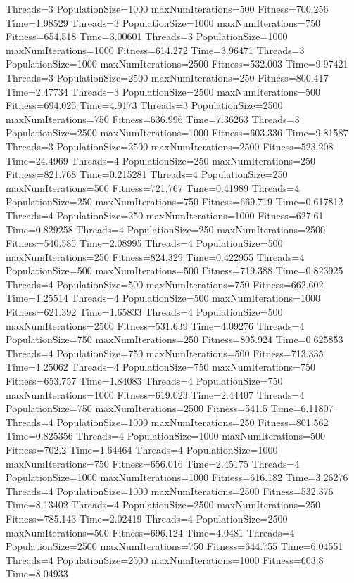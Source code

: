 \documentclass[10pt,letterpaper]{article}
\begin{document}
Threads=3 PopulationSize=1000 maxNumIterations=500 Fitness=700.256 Time=1.98529
Threads=3 PopulationSize=1000 maxNumIterations=750 Fitness=654.518 Time=3.00601
Threads=3 PopulationSize=1000 maxNumIterations=1000 Fitness=614.272 Time=3.96471
Threads=3 PopulationSize=1000 maxNumIterations=2500 Fitness=532.003 Time=9.97421
Threads=3 PopulationSize=2500 maxNumIterations=250 Fitness=800.417 Time=2.47734
Threads=3 PopulationSize=2500 maxNumIterations=500 Fitness=694.025 Time=4.9173
Threads=3 PopulationSize=2500 maxNumIterations=750 Fitness=636.996 Time=7.36263
Threads=3 PopulationSize=2500 maxNumIterations=1000 Fitness=603.336 Time=9.81587
Threads=3 PopulationSize=2500 maxNumIterations=2500 Fitness=523.208 Time=24.4969
Threads=4 PopulationSize=250 maxNumIterations=250 Fitness=821.768 Time=0.215281
Threads=4 PopulationSize=250 maxNumIterations=500 Fitness=721.767 Time=0.41989
Threads=4 PopulationSize=250 maxNumIterations=750 Fitness=669.719 Time=0.617812
Threads=4 PopulationSize=250 maxNumIterations=1000 Fitness=627.61 Time=0.829258
Threads=4 PopulationSize=250 maxNumIterations=2500 Fitness=540.585 Time=2.08995
Threads=4 PopulationSize=500 maxNumIterations=250 Fitness=824.329 Time=0.422955
Threads=4 PopulationSize=500 maxNumIterations=500 Fitness=719.388 Time=0.823925
Threads=4 PopulationSize=500 maxNumIterations=750 Fitness=662.602 Time=1.25514
Threads=4 PopulationSize=500 maxNumIterations=1000 Fitness=621.392 Time=1.65833
Threads=4 PopulationSize=500 maxNumIterations=2500 Fitness=531.639 Time=4.09276
Threads=4 PopulationSize=750 maxNumIterations=250 Fitness=805.924 Time=0.625853
Threads=4 PopulationSize=750 maxNumIterations=500 Fitness=713.335 Time=1.25062
Threads=4 PopulationSize=750 maxNumIterations=750 Fitness=653.757 Time=1.84083
Threads=4 PopulationSize=750 maxNumIterations=1000 Fitness=619.023 Time=2.44407
Threads=4 PopulationSize=750 maxNumIterations=2500 Fitness=541.5 Time=6.11807
Threads=4 PopulationSize=1000 maxNumIterations=250 Fitness=801.562 Time=0.825356
Threads=4 PopulationSize=1000 maxNumIterations=500 Fitness=702.2 Time=1.64464
Threads=4 PopulationSize=1000 maxNumIterations=750 Fitness=656.016 Time=2.45175
Threads=4 PopulationSize=1000 maxNumIterations=1000 Fitness=616.182 Time=3.26276
Threads=4 PopulationSize=1000 maxNumIterations=2500 Fitness=532.376 Time=8.13402
Threads=4 PopulationSize=2500 maxNumIterations=250 Fitness=785.143 Time=2.02419
Threads=4 PopulationSize=2500 maxNumIterations=500 Fitness=696.124 Time=4.0481
Threads=4 PopulationSize=2500 maxNumIterations=750 Fitness=644.755 Time=6.04551
Threads=4 PopulationSize=2500 maxNumIterations=1000 Fitness=603.8 Time=8.04933
\end{document}
